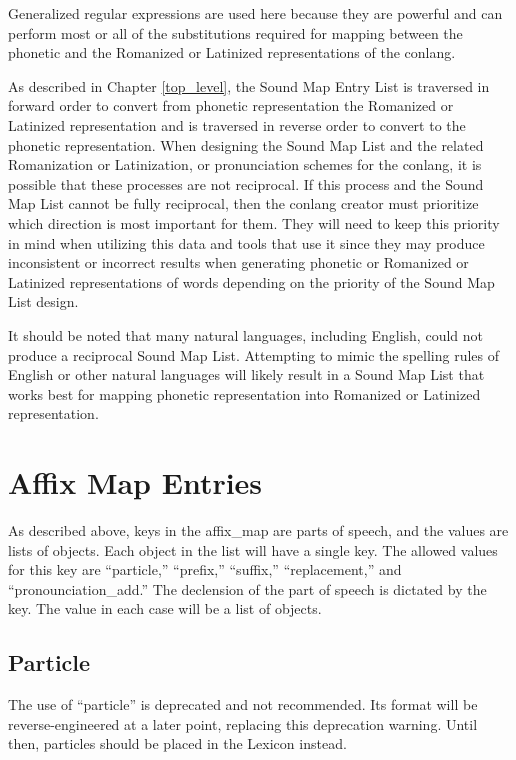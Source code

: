 Generalized regular expressions are used here because they are powerful and can perform most or all of the substitutions required for mapping between the phonetic and the Romanized or Latinized representations of the conlang.  

As described in Chapter \ref{top_level}, the Sound Map Entry List is traversed in forward order to convert from phonetic representation the Romanized or Latinized representation and is traversed in reverse order to convert to the phonetic representation.  When designing the Sound Map List and the related Romanization or Latinization, or pronunciation schemes for the conlang, it is possible that these processes are not reciprocal.  If this process and the Sound Map List cannot be fully reciprocal, then the conlang creator must prioritize which direction is most important for them.  They will need to keep this priority in mind when utilizing this data and tools that use it since they may produce inconsistent or incorrect results when generating phonetic or Romanized or Latinized representations of words depending on the priority of the Sound Map List design.

It should be noted that many natural languages, including English, could not produce a reciprocal Sound Map List.  Attempting to mimic the spelling rules of English or other natural languages will likely result in a Sound Map List that works best for mapping phonetic representation into Romanized or Latinized representation.

\chapter{Affix Map Entries}
As described above, keys in the affix\_map are parts of speech, and the values are lists of objects.  Each object in the list will have a single key.  The allowed values for this key are ``particle,'' ``prefix,'' ``suffix,'' ``replacement,'' and ``pronounciation\_add.''  The declension of the part of speech is dictated by the key.  The value in each case will be a list of objects.

\section{Particle}

The use of ``particle'' is deprecated and not recommended.  Its format will be reverse-engineered at a later point, replacing this deprecation warning.  Until then, particles should be placed in the Lexicon instead.

